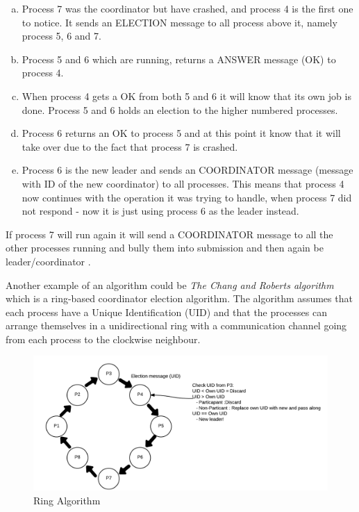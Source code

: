 \documentclass[Main]{subfiles}
\begin{document}
\begin{enumerate}[a)]
\item Process 7 was the coordinator but have crashed, and process 4 is the first one to notice. It sends an ELECTION message to all process above it, namely process 5, 6 and 7.  
\item Process 5 and 6 which are running, returns a ANSWER message (OK) to process 4. 
\item When process 4 gets a OK from both 5 and 6 it will know that its own job is done. Process 5 and 6 holds an election to the higher numbered processes. 
\item Process 6 returns an OK to process 5 and at this point it know that it will take over due to the fact that process 7 is crashed. 
\item Process 6 is the new leader and sends an COORDINATOR message (message with ID of the new coordinator) to all processes. This means that process 4 now continues with the operation it was trying to handle, when process 7 did not respond - now it is just using process 6 as the leader instead.
\end{enumerate}

If process 7 will run again it will send a COORDINATOR message to all the other processes running and bully them into submission and then again be leader/coordinator \cite{ElectionAlgorithm}.

Another example of an algorithm could be \textit{The Chang and Roberts algorithm} which is a ring-based coordinator election algorithm. The algorithm assumes that each process have a Unique Identification (UID) and that the processes can arrange themselves in a unidirectional ring with a communication channel going from each process to the clockwise neighbour.

\begin{figure}[H]
\centering
\includegraphics[scale=0.30]{Figurer/ChangAndRobertsRingAlgorithm.png}
\caption{Ring Algorithm}
\end{figure}
\end{document}
